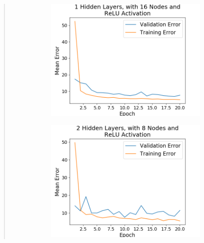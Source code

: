 \documentclass{article}
\begin{document}
\begin{quote}
\begin{figure}[h]
\begin{subfigure}[h]{0.23\textwidth}
		\includegraphics[width=\textwidth]{figs/Boston_Housing_Regression_1_Hidden_Layers_with_16_Nodes_and_ReLU_Activation.png}
	\end{subfigure}
	\begin{subfigure}[h]{0.23\textwidth}
		\includegraphics[width=\textwidth]{figs/Boston_Housing_Regression_2_Hidden_Layers_with_8_Nodes_and_ReLU_Activation.png}
	\end{subfigure}
	\begin{subfigure}[h]{0.23\textwidth}

\end{subfigure}
\end{figure}
\end{quote}
\end{document}
